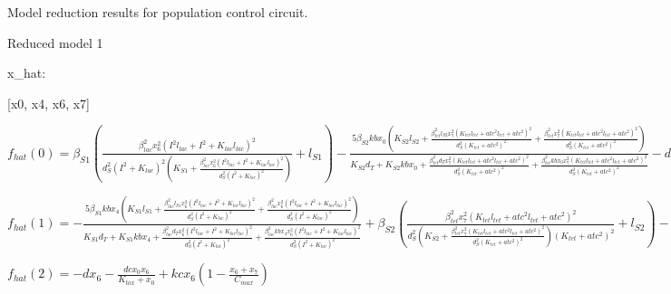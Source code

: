 Model reduction results for population control circuit. 



Reduced model 1

x_{hat}: 

[x0, x4, x6, x7]


$f_{hat}(0)=\beta_{S1} \left(\frac{\beta_{lac}^{2} x_{6}^{2} \left(I^{2} l_{lac} + I^{2} + K_{lac} l_{lac}\right)^{2}}{d_{S}^{2} \left(I^{2} + K_{lac}\right)^{2} \left(K_{S1} + \frac{\beta_{lac}^{2} x_{6}^{2} \left(I^{2} l_{lac} + I^{2} + K_{lac} l_{lac}\right)^{2}}{d_{S}^{2} \left(I^{2} + K_{lac}\right)^{2}}\right)} + l_{S1}\right) - \frac{5 \beta_{S2} kb x_{0} \left(K_{S2} l_{S2} + \frac{\beta_{tet}^{2} l_{S2} x_{7}^{2} \left(K_{tet} l_{tet} + atc^{2} l_{tet} + atc^{2}\right)^{2}}{d_{S}^{2} \left(K_{tet} + atc^{2}\right)^{2}} + \frac{\beta_{tet}^{2} x_{7}^{2} \left(K_{tet} l_{tet} + atc^{2} l_{tet} + atc^{2}\right)^{2}}{d_{S}^{2} \left(K_{tet} + atc^{2}\right)^{2}}\right)}{K_{S2} d_{T} + K_{S2} kb x_{0} + \frac{\beta_{tet}^{2} d_{T} x_{7}^{2} \left(K_{tet} l_{tet} + atc^{2} l_{tet} + atc^{2}\right)^{2}}{d_{S}^{2} \left(K_{tet} + atc^{2}\right)^{2}} + \frac{\beta_{tet}^{2} kb x_{0} x_{7}^{2} \left(K_{tet} l_{tet} + atc^{2} l_{tet} + atc^{2}\right)^{2}}{d_{S}^{2} \left(K_{tet} + atc^{2}\right)^{2}}} - d_{T} x_{0}$


$f_{hat}(1)=- \frac{5 \beta_{S1} kb x_{4} \left(K_{S1} l_{S1} + \frac{\beta_{lac}^{2} l_{S1} x_{6}^{2} \left(I^{2} l_{lac} + I^{2} + K_{lac} l_{lac}\right)^{2}}{d_{S}^{2} \left(I^{2} + K_{lac}\right)^{2}} + \frac{\beta_{lac}^{2} x_{6}^{2} \left(I^{2} l_{lac} + I^{2} + K_{lac} l_{lac}\right)^{2}}{d_{S}^{2} \left(I^{2} + K_{lac}\right)^{2}}\right)}{K_{S1} d_{T} + K_{S1} kb x_{4} + \frac{\beta_{lac}^{2} d_{T} x_{6}^{2} \left(I^{2} l_{lac} + I^{2} + K_{lac} l_{lac}\right)^{2}}{d_{S}^{2} \left(I^{2} + K_{lac}\right)^{2}} + \frac{\beta_{lac}^{2} kb x_{4} x_{6}^{2} \left(I^{2} l_{lac} + I^{2} + K_{lac} l_{lac}\right)^{2}}{d_{S}^{2} \left(I^{2} + K_{lac}\right)^{2}}} + \beta_{S2} \left(\frac{\beta_{tet}^{2} x_{7}^{2} \left(K_{tet} l_{tet} + atc^{2} l_{tet} + atc^{2}\right)^{2}}{d_{S}^{2} \left(K_{S2} + \frac{\beta_{tet}^{2} x_{7}^{2} \left(K_{tet} l_{tet} + atc^{2} l_{tet} + atc^{2}\right)^{2}}{d_{S}^{2} \left(K_{tet} + atc^{2}\right)^{2}}\right) \left(K_{tet} + atc^{2}\right)^{2}} + l_{S2}\right) - d_{T} x_{4}$


$f_{hat}(2)=- d x_{6} - \frac{dc x_{0} x_{6}}{K_{tox} + x_{0}} + kc x_{6} \left(1 - \frac{x_{6} + x_{7}}{C_{max}}\right)$


